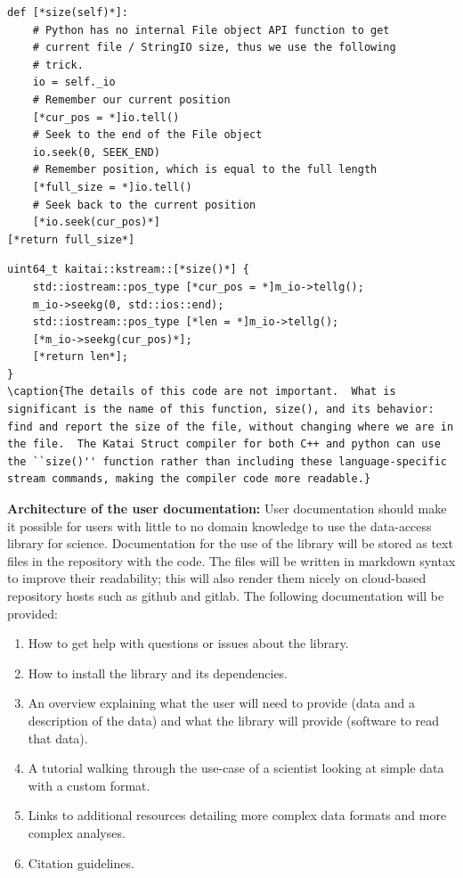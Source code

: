 \begin{lstlisting}
def [*size(self)*]:
    # Python has no internal File object API function to get
    # current file / StringIO size, thus we use the following
    # trick.
    io = self._io
    # Remember our current position
    [*cur_pos = *]io.tell()
    # Seek to the end of the File object
    io.seek(0, SEEK_END)
    # Remember position, which is equal to the full length
    [*full_size = *]io.tell()
    # Seek back to the current position
    [*io.seek(cur_pos)*]
[*return full_size*]
\end{lstlisting}

\begin{lstlisting}
uint64_t kaitai::kstream::[*size()*] {
    std::iostream::pos_type [*cur_pos = *]m_io->tellg();
    m_io->seekg(0, std::ios::end);
    std::iostream::pos_type [*len = *]m_io->tellg();
    [*m_io->seekg(cur_pos)*];
    [*return len*];
}
\caption{The details of this code are not important.  What is significant is the name of this function, size(), and its behavior: find and report the size of the file, without changing where we are in the file.  The Katai Struct compiler for both C++ and python can use the ``size()'' function rather than including these language-specific stream commands, making the compiler code more readable.}
\end{lstlisting}

\textbf{Architecture of the user documentation:} User documentation should make it possible for users with little to no domain knowledge to use the data-access library for science.  Documentation for the use of the library will be stored as text files in the repository with the code.  The files will be written in markdown syntax to improve their readability; this will also render them nicely on cloud-based repository hosts such as github and gitlab.  The following documentation will be provided:

\begin{enumerate}
    \item How to get help with questions or issues about the library.
    \item How to install the library and its dependencies.
    \item An overview explaining what the user will need to provide (data and a description of the data) and what the library will provide (software to read that data).
    \item A tutorial walking through the use-case of a scientist looking at simple data with a custom format.
    \item Links to additional resources detailing more complex data formats and more complex analyses.
    \item Citation guidelines.  
\end{enumerate}


